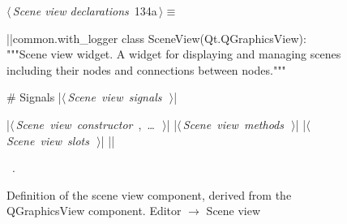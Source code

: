 \documentclass[%
    a4paper,    %
    justified,  %
    nobib,      %
    openany     %
]{tufte-book}
\makeatletter
\renewcommand{\label}[1]{\@tufte@label{##1}}%
\makeatother
\begin{document}
\begin{figure}[!htbp]
\begin{flushleft} \small
\begin{minipage}{\linewidth}\label{scrap80}\raggedright\small
{} $\langle\,${\itshape Scene view declarations}\nobreak\ {\footnotesize {134a}}$\,\rangle\equiv$
\vspace{-1ex}
\begin{pythoncode}
|\normalfont{}\fontfamily{}|common.with_logger
class SceneView(Qt.QGraphicsView):
    """Scene view widget.
    A widget for displaying and managing scenes including their
    nodes and connections between nodes."""

    # Signals
    |\hbox{$\langle\,${\itshape Scene view signals}\nobreak\ {\footnotesize {}}$\,\rangle$}|

    |\hbox{$\langle\,${\itshape Scene view constructor}\nobreak\ {\footnotesize {}, \ldots\ }$\,\rangle$}|
    |\hbox{$\langle\,${\itshape Scene view methods}\nobreak\ {\footnotesize {}}$\,\rangle$}|
    |\hbox{$\langle\,${\itshape Scene view slots}\nobreak\ {\footnotesize {}}$\,\rangle$}|
|\NWsep|
\end{pythoncode}
\vspace{1.5ex}
\footnotesize
\begin{list}{}{\setlength{\itemsep}{-\parsep}\setlength{\itemindent}{-\leftmargin}}
\item \NWtxtMacroRefIn\ .

\item{}
\end{list}
\end{minipage}\vspace{4ex}
\end{flushleft}
\caption{Definition of the scene view component, derived from the QGraphicsView
  component.
  \newline{}\newline{}Editor $\rightarrow$ Scene view}
\end{figure}
\end{document}
